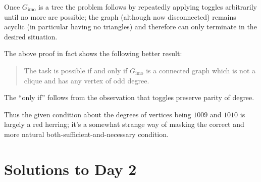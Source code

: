 Once $G_{\text{imo}}$ is a tree the problem follows by repeatedly applying
toggles arbitrarily until no more are possible;
the graph (although now disconnected) remains acyclic
(in particular having no triangles)
and therefore can only terminate in the desired situation.

\begin{remark*}
  The above proof in fact shows the following better result:
  \begin{quote}
  The task is possible if and only if
  $G_{\text{imo}}$ is a connected graph which is not a clique
  and has any vertex of odd degree.
  \end{quote}
  The ``only if'' follows from the observation
  that toggles preserve parity of degree.

  Thus the given condition about the degrees of vertices
  being $1009$ and $1010$ is largely a red herring;
  it's a somewhat strange way of masking the correct and more natural
  both-sufficient-and-necessary condition.
\end{remark*}
\pagebreak

\section{Solutions to Day 2}